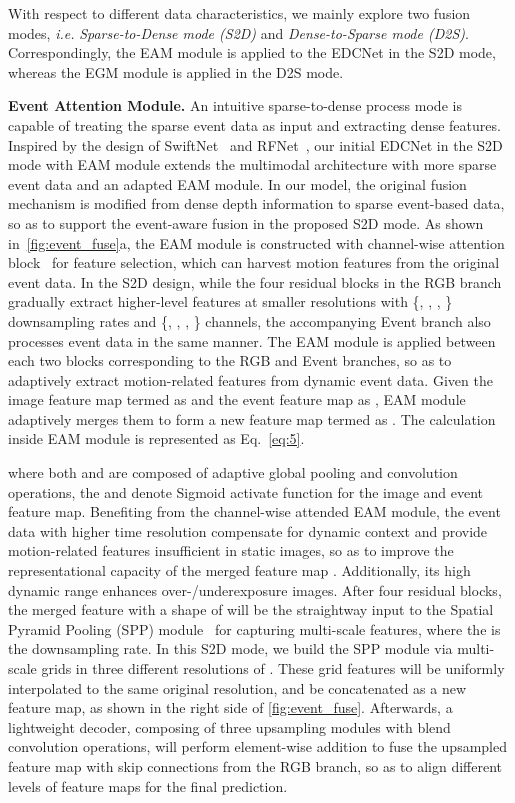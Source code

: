 \documentclass[journal]{IEEEtran}
\begin{document}
With respect to different data characteristics, we mainly explore two fusion modes, \textit{i.e.} \emph{Sparse-to-Dense mode (S2D)} and \emph{Dense-to-Sparse mode (D2S)}. Correspondingly, the EAM module is applied to the EDCNet in the S2D mode, {whereas} the EGM module is applied in the D2S mode.

\textbf{Event Attention Module.} 
An intuitive sparse-to-dense process mode is capable of treating the sparse event data as input and extracting dense features. Inspired by the design of SwiftNet~\cite{orsic2019swiftnet} and RFNet~\cite{sun2020rfnet}, our initial EDCNet in the S2D mode with EAM module extends the multimodal architecture with more sparse event data and an adapted EAM module. In our model, the original fusion mechanism is modified from dense depth information to sparse event-based data, so as to support the event-aware fusion in the proposed S2D mode. As shown in~\cref{fig:event_fuse}a, the EAM module is constructed with channel-wise attention block~\cite{hu2018SEBlock} for feature selection, which can harvest motion features from the original event data. In the S2D design, while the four residual blocks in the RGB branch gradually extract higher-level features at smaller resolutions with \{, , , \} downsampling rates and \{, , , \} channels, the accompanying Event branch also processes event data in the same manner. The EAM module is applied between each two blocks corresponding to the RGB and Event branches, so as to adaptively extract motion-related features from dynamic event data. 
Given the image feature map termed as  and the event feature map as , EAM module adaptively merges them to form a new feature map termed as . The calculation inside EAM module is represented as Eq.~\eqref{eq:5}.

where both  and  are composed of adaptive global pooling and  convolution operations, the  and  denote Sigmoid activate function for the image and event feature map. Benefiting from the channel-wise attended EAM module, the event data with higher time resolution compensate for dynamic context and provide motion-related features {insufficient} in static images, so as to improve the representational capacity of the merged feature map . Additionally, its high dynamic range enhances over-/underexposure images. After four residual blocks, the merged feature with a shape of  will be the straightway input to the Spatial Pyramid Pooling (SPP) module~\cite{zhao2017PSPNet} for capturing multi-scale features, where the  is the downsampling rate. In this S2D mode, we build the SPP module via multi-scale grids in three different resolutions of . These grid features will be uniformly interpolated to the same original resolution, and be concatenated as a new feature map, as shown in the right side of \cref{fig:event_fuse}. Afterwards, a lightweight decoder, composing of three upsampling modules with blend convolution operations, will perform element-wise addition to fuse the upsampled feature map with  skip connections from the RGB branch, so as to align different levels of feature maps for the final prediction. 
\end{document}
